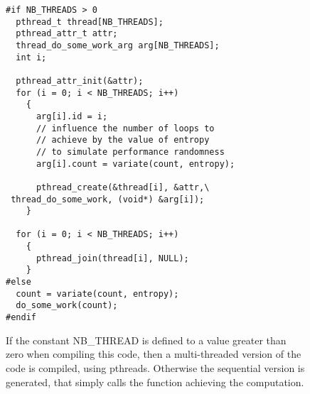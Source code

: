 \begin{figure}
\centering
\begin{lstlisting}
#if NB_THREADS > 0
  pthread_t thread[NB_THREADS];
  pthread_attr_t attr;
  thread_do_some_work_arg arg[NB_THREADS];
  int i;

  pthread_attr_init(&attr);
  for (i = 0; i < NB_THREADS; i++)
    {
      arg[i].id = i;
      // influence the number of loops to
      // achieve by the value of entropy
      // to simulate performance randomness
      arg[i].count = variate(count, entropy);

      pthread_create(&thread[i], &attr,\
 thread_do_some_work, (void*) &arg[i]);
    }

  for (i = 0; i < NB_THREADS; i++)
    {
      pthread_join(thread[i], NULL);
    }
#else
  count = variate(count, entropy);
  do_some_work(count);
#endif
\end{lstlisting}
\caption{If the constant {NB\_THREAD} is defined to a value greater than zero when compiling this code, then a multi-threaded version of the code is compiled, using pthreads. Otherwise the sequential version is generated, that simply calls the function achieving the computation.}
\label{fig:directive}
\end{figure}

